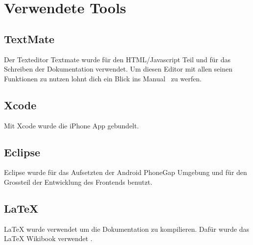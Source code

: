 
\newpage
\section{Verwendete Tools} %
\label{sec:Verwendete Tools}

\subsection{TextMate} %
\label{sub:TextMate}
Der Texteditor Textmate wurde für den HTML/Javascript Teil und für das Schreiben der Dokumentation verwendet. Um diesen Editor mit allen seinen Funktionen zu nutzen lohnt dich ein Blick ins Manual~\cite{bib:textmate} zu werfen.

\subsection{Xcode} %
\label{ssub:Xcode}
Mit Xcode wurde die iPhone App gebundelt.

\subsection{Eclipse} %
\label{sub:eclispe}
Eclipse wurde für das Aufsetzten der Android PhoneGap Umgebung und für den Grossteil der Entwicklung des Frontends benutzt.

\subsection{LaTeX} %
\label{sub:LaTeX}
LaTeX wurde verwendet um die Dokumentation zu kompilieren. Dafür wurde das LaTeX Wikibook verwendet \cite{bib:latex}.
